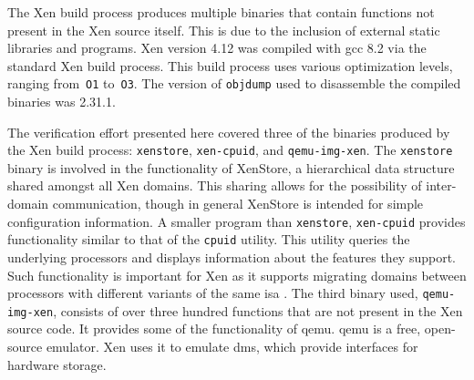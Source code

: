 The Xen build process produces multiple binaries
that contain functions not present in the Xen source itself.
This is due to the inclusion of external static libraries and programs.
Xen version 4.12 was compiled with \ac{gcc} 8.2 via the standard Xen build process.
This build process uses various optimization levels,
ranging from~\texttt{O1} to~\texttt{O3}.
The version of \texttt{objdump} used to disassemble the compiled binaries was 2.31.1.%
%

The verification effort presented here
covered three of the binaries produced by the Xen build process:
\lstinline|xenstore|, \lstinline|xen-cpuid|, and \lstinline|qemu-img-xen|.
The \lstinline|xenstore| binary is involved in the functionality of
XenStore,
a hierarchical data structure shared amongst all Xen domains.
This sharing allows for the possibility of inter-domain communication,
though in general XenStore is intended for simple configuration information.
A smaller program than \lstinline|xenstore|, \lstinline|xen-cpuid|
provides functionality similar to that of the
\lstinline|cpuid| utility.
This utility queries the underlying processors
and displays information about the features they support.
Such functionality is important for Xen
as it supports migrating domains
between processors with different variants of the same \ac{isa} \autocite{cpuid-masking}.
The third binary used, \lstinline|qemu-img-xen|,
consists of over three hundred functions
that are not present in the Xen source code.
It provides some of the functionality of \ac{qemu}.
\Ac{qemu} is a free, open-source emulator.%
Xen uses it to emulate \acp{dm}, which provide interfaces for hardware storage.

